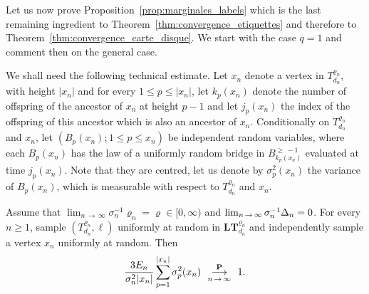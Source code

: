 \documentclass[AHL,Unicode,longabstracts,published]{cedram}
\newcommand{\ensembles}[1]{\mathbf{#1}}
\renewcommand{\P}{\ensembles{P}}
\newcommand{\1}{\ensembles{1}}
\newcommand{\LTree}{\mathbf{LT}}
\renewcommand{\le}{\leqslant}
\renewcommand{\ge}{\geqslant}
\newcommand{\BBmap}{B}
\newcommand{\fn}{T_{d_n}^{\varrho_n}}
\newcommand{\LFn}{\LTree_{d_n}^{\varrho_n}}
\newcommand{\edges}{E}
\newcommand{\cvproba}[1][n]{\enskip\mathop{\longrightarrow}^{\P}_{#1\,\to\, \infty}\enskip}
\begin{document}
Let us now prove Proposition~\ref{prop:marginales_labels} which is the last remaining ingredient to Theorem~\ref{thm:convergence_etiquettes} and therefore to Theorem~\ref{thm:convergence_carte_disque}. We start with the case $q=1$ and comment then on the general case.

We shall need the following technical estimate. Let $x_n$ denote a vertex in $\fn$, with height $|x_n|$ and for every $1 \le p \le |x_n|$, let $k_p(x_n)$ denote the number of offspring of the ancestor of $x_n$ at height $p-1$ and let $j_p(x_n)$ the index of the offspring of this ancestor which is also an ancestor of $x_n$. Conditionally on $\fn$ and $x_n$, let $(B_p(x_n) ; 1 \le p \le x_n)$ be independent random variables, where each $B_p(x_n)$ has the law of a uniformly random bridge in $\BBmap_{k_p(x_n)}^{\ge\,-1}$ evaluated at time $j_p(x_n)$. Note that they are centred, let us denote by $\sigma^2_p(x_n)$ the variance of $B_p(x_n)$, which is measurable with respect to $\fn$ and $x_n$.

\begin{lemm}\label{lem:convergence_variance_labels}
Assume that $\lim_{n\,\to\,\infty} \sigma_n^{-1} \varrho_n = \varrho \in [0, \infty)$ and $\lim_{n\,\to\, \infty} \sigma_n^{-1} \Delta_n\linebreak= 0$. For every $n \ge 1$, sample $(\fn, \ell)$ uniformly at random in $\LFn$ and independently sample a vertex $x_n$ uniformly at random. Then
\[
\frac{3 \edges_n}{\sigma_n^2 |x_n|} \sum_{p=1}^{|x_n|} \sigma^2_p(x_n) \cvproba 1.
\]
\end{lemm}
\end{document}
